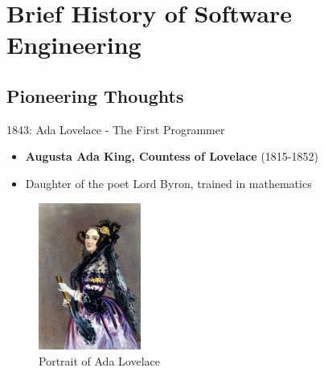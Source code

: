\documentclass{beamer}
\begin{document}
\section{Brief History of Software Engineering}
\subsection{Pioneering Thoughts}

\begin{frame}[t]{1843: Ada Lovelace - The First Programmer}
        \begin{itemize}
            \item \textbf{Augusta Ada King, Countess of Lovelace} (1815-1852)
            \item Daughter of the poet Lord Byron, trained in mathematics
        \end{itemize}
        \begin{figure}[b]
            \centering
            \includegraphics[width=0.3\textwidth]{images/Ada_Lovelace_portrait.jpg}
            \caption{Portrait of Ada Lovelace}
        \end{figure}
\end{frame}
\end{document}
